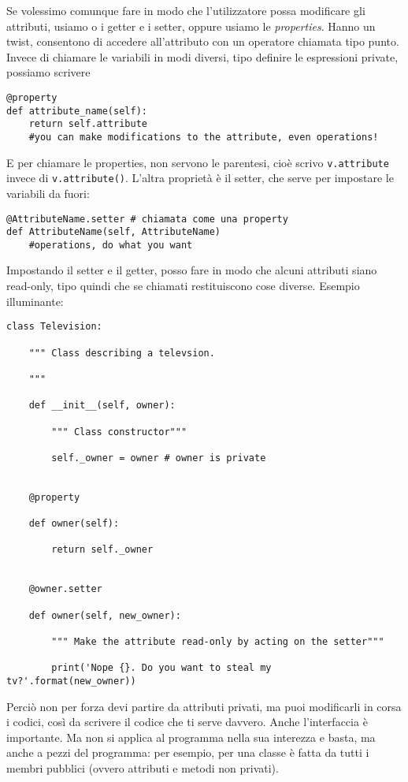 \documentclass[10pt, a4paper, titlepage]{book}
\begin{document}
Se volessimo comunque fare in modo che l'utilizzatore possa modificare gli attributi, usiamo o i getter e i setter, oppure usiamo le \textit{properties}. Hanno un twist, consentono di accedere all'attributo con un operatore chiamata tipo punto.
Invece di chiamare le variabili in modi diversi, tipo definire le espressioni private, possiamo scrivere
\begin{verbatim}
@property
def attribute_name(self):
	return self.attribute 
	#you can make modifications to the attribute, even operations!
\end{verbatim}

E per chiamare le properties, non servono le parentesi, cioè scrivo \texttt{v.attribute} invece di \texttt{v.attribute()}.
L'altra proprietà è il setter, che serve per impostare le variabili da fuori:

\begin{verbatim}
@AttributeName.setter # chiamata come una property
def AttributeName(self, AttributeName)
	#operations, do what you want
\end{verbatim}

Impostando il setter e il getter, posso fare in modo che alcuni attributi siano read-only, tipo quindi che se chiamati restituiscono cose diverse.
Esempio illuminante:

\begin{verbatim}
class Television:

	""" Class describing a televsion.

	"""

	def __init__(self, owner):

		""" Class constructor"""

		self._owner = owner # owner is private

	
	@property

	def owner(self):

		return self._owner

	
	@owner.setter

	def owner(self, new_owner):

		""" Make the attribute read-only by acting on the setter"""

		print('Nope {}. Do you want to steal my tv?'.format(new_owner))
\end{verbatim}

Perciò non per forza devi partire da attributi privati, ma puoi modificarli in corsa i codici, così da scrivere il codice che ti serve davvero.
Anche l'interfaccia è importante. Ma non si applica al programma nella sua interezza e basta, ma anche a pezzi del programma: per esempio, per una classe è fatta da tutti i membri pubblici (ovvero attributi e metodi non privati).
\end{document}
